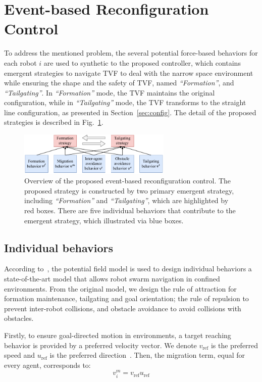 \section{Event-based Reconfiguration Control}\label{sec3}

To address the mentioned problem, the several potential force-based behaviors for each robot $i$ are used to synthetic to the proposed controller, which contains emergent strategies to navigate TVF to deal with the narrow space environment while ensuring the shape and the safety of TVF, named \textit{``Formation''}, and \textit{``Tailgating''}. In \textit{``Formation''} mode, the TVF maintains the original configuration, while in \textit{``Tailgating''} mode, the TVF transforms to the straight line configuration, as presented in Section~\ref{sec:config}. The detail of the proposed strategies is described in Fig.~\ref{fig:1control_diagram}.

\begin{figure}
    \centering
    \includegraphics[width=0.65\textwidth]{paper2/images/control_diagram.pdf}
    \caption{Overview of the proposed event-based reconfiguration control. The proposed strategy is constructed by two primary emergent strategy, including \textit{``Formation''} and \textit{``Tailgating''}, which are highlighted by red boxes. There are five individual behaviors that contribute to the emergent strategy, which illustrated via blue boxes.}
    \label{fig:1control_diagram}
\end{figure}

\subsection{Individual behaviors}
According to~\cite{Vsrhelyi2018}, the potential field model is used to design individual behaviors a state-of-the-art model that allows robot swarm navigation in confined environments. From the original model, we design the rule of attraction for formation maintenance, tailgating and goal orientation; the rule of repulsion to prevent inter-robot collisions, and obstacle avoidance to avoid collisions with 
obstacles. 

Firstly, to ensure goal-directed motion in environments, a target reaching behavior is provided by a preferred velocity vector. We denote $v_\text{ref}$ is the preferred speed and $u_\text{ref}$ is the preferred direction~\cite{6095129}. Then, the migration term, equal for every agent, corresponds to:
\begin{equation}
    v_i^m=v_\text{ref}u_\text{ref}
\end{equation}

